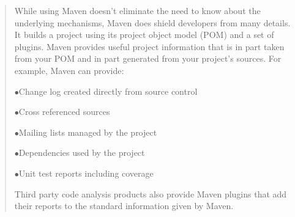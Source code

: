 \begin{quote}
While using Maven doesn’t eliminate the need to know about the underlying mechanisms, Maven does shield developers from many details. It builds a project using its project object model (POM) and a set of plugins. Maven provides useful project information that is in part taken from your POM and in part generated from your project’s sources. For example, Maven can provide:
    \begin{description}
    \item $\bullet$Change log created directly from source control
    \item $\bullet$Cross referenced sources
    \item $\bullet$Mailing lists managed by the project
    \item $\bullet$Dependencies used by the project
    \item $\bullet$Unit test reports including coverage
     \end{description}
Third party code analysis products also provide Maven plugins that add their reports to the standard information given by Maven.

\end{quote}

 







